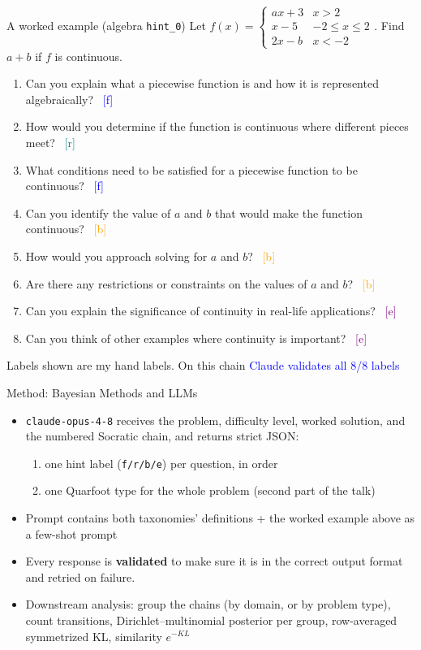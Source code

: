 \documentclass[10pt,aspectratio=169]{beamer}
\newcommand{\good}[1]{\textcolor{blue}{#1}}
\newcommand{\hf}{\textcolor{blue}{[f]}}
\newcommand{\hr}{\textcolor{teal}{[r]}}
\newcommand{\hb}{\textcolor{orange}{[b]}}
\newcommand{\he}{\textcolor{purple}{[e]}}
\begin{document}
\begin{frame}{A worked example (algebra \texttt{hint\_0})}
  \small
  Let
  $f(x)=\begin{cases} ax+3 & x>2\\ x-5 & -2\le x\le 2\\ 2x-b & x<-2 \end{cases}$.
  \quad Find $a+b$ if $f$ is continuous.
  \medskip
  \begin{enumerate}\footnotesize
    \item Can you explain what a piecewise function is and how it is represented algebraically?  ~\hf  
    \item How would you determine if the function is continuous where different pieces meet?  ~\hr  
    \item What conditions need to be satisfied for a piecewise function to be continuous? ~\hf  
    \item Can you identify the value of $a$ and $b$ that would make the function continuous? ~\hb  
    \item How would you approach solving for $a$ and $b$? ~\hb  
    \item Are there any restrictions or constraints on the values of $a$ and $b$? ~\hb  
    \item Can you explain the significance of continuity in real-life applications? ~\he  
    \item Can you think of other examples where continuity is important? ~\he  
  \end{enumerate}
  \medskip
  \normalsize
  Labels shown are my hand labels. On this chain
  \good{Claude validates all 8/8 labels }
\end{frame}


\begin{frame}{Method: Bayesian Methods and LLMs}
  \begin{itemize}
    \item \texttt{claude-opus-4-8} receives the problem, difficulty level, worked solution, and the numbered Socratic chain, and returns strict JSON:  
    \begin{enumerate}
      \item one hint label (\texttt{f/r/b/e}) per question, in order  
      \item one Quarfoot type for the whole problem (second part of the talk)
    \end{enumerate}  
    \item Prompt contains both taxonomies' definitions + the worked example above as a few-shot prompt   
    \item Every response is \textbf{validated} to make sure it is in the correct output format and retried on failure.  
    \item Downstream analysis: group the chains (by domain, or by problem type), count
          transitions, Dirichlet--multinomial posterior per group, row-averaged
          symmetrized KL, similarity $e^{-KL}$
  \end{itemize}
\end{frame}
\end{document}
